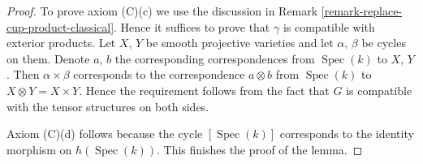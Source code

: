 \documentclass[10pt,a4paper]{amsart}
\theoremstyle{plain}
\theoremstyle{definition}
\theoremstyle{remark}
\numberwithin{equation}{subsection}
\def\Spec{\mathop{\mathrm{Spec}}}
\begin{document}
\begin{proof}
\medskip\noindent
To prove axiom (C)(c) we use the discussion in
Remark \ref{remark-replace-cup-product-classical}.
Hence it suffices to prove that $\gamma$ is compatible with
exterior products. Let $X$, $Y$ be smooth projective varieties and
let $\alpha$, $\beta$ be cycles on them. Denote
$a$, $b$ the corresponding correspondences from $\Spec(k)$ to
$X$, $Y$. Then $\alpha \times \beta$ corresponds to the
correspondence $a \otimes b$ from $\Spec(k)$ to $X \otimes Y = X \times Y$.
Hence the requirement follows from the fact that $G$ is
compatible with the tensor structures on both sides.

\medskip\noindent
Axiom (C)(d) follows because the cycle $[\Spec(k)]$
corresponds to the identity morphism on $h(\Spec(k))$.
This finishes the proof of the lemma.
\end{proof}
\end{document}
